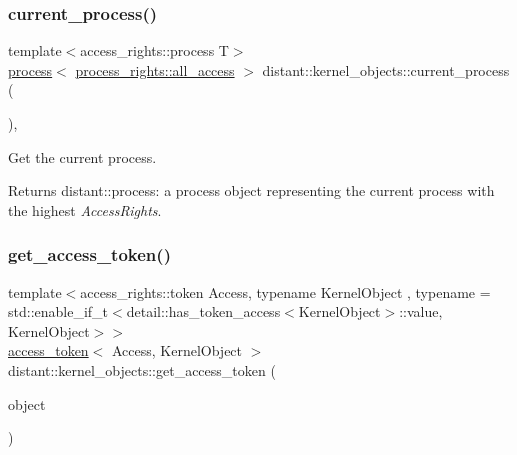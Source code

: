 \subsubsection{\texorpdfstring{current\+\_\+process()}{current\_process()}\hspace{0.1cm}{\footnotesize\ttfamily [2/2]}}
{\footnotesize\ttfamily template$<$access\+\_\+rights\+::process T$>$ \\
\mbox{\hyperlink{classdistant_1_1kernel__objects_1_1process}{process}}$<$ \mbox{\hyperlink{structdistant_1_1access__rights_ae153052a690584111c46ec7a78d1ef81a87233263ddd52f3e3067eafc32d3b7a6}{process\+\_\+rights\+::all\+\_\+access}} $>$ distant\+::kernel\+\_\+objects\+::current\+\_\+process (\begin{DoxyParamCaption}{ }\end{DoxyParamCaption})\hspace{0.3cm}{\ttfamily [inline]}, {\ttfamily [noexcept]}}



Get the current process. 

\begin{DoxyReturn}{Returns}
distant\+::process\+: a process object representing the current process with the highest {\itshape Access\+Rights}. 
\end{DoxyReturn}
\mbox{\label{namespacedistant_1_1kernel__objects_a3729729dfaad90c6567da506deef03cf}} 
\subsubsection{\texorpdfstring{get\+\_\+access\+\_\+token()}{get\_access\_token()}\hspace{0.1cm}{\footnotesize\ttfamily [1/4]}}
{\footnotesize\ttfamily template$<$access\+\_\+rights\+::token Access, typename Kernel\+Object , typename  = std\+::enable\+\_\+if\+\_\+t$<$detail\+::has\+\_\+token\+\_\+access$<$\+Kernel\+Object$>$\+::value, Kernel\+Object$>$$>$ \\
\mbox{\hyperlink{classdistant_1_1kernel__objects_1_1access__token}{access\+\_\+token}}$<$ Access, Kernel\+Object $>$ distant\+::kernel\+\_\+objects\+::get\+\_\+access\+\_\+token (\begin{DoxyParamCaption}\item[{const Kernel\+Object \&}]{object }\end{DoxyParamCaption})\hspace{0.3cm}{\ttfamily [noexcept]}}



